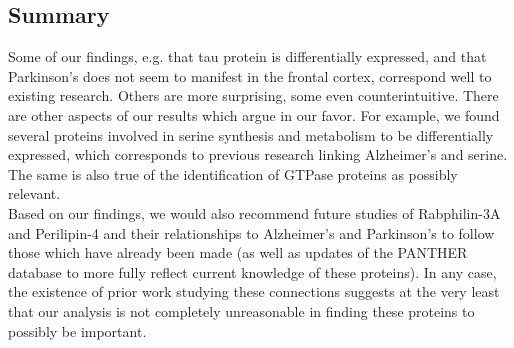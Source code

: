 \subsection{Summary}
\label{sec:summary}

Some of our findings, e.g. that tau protein is differentially expressed, and that Parkinson's does not seem to manifest in the frontal cortex, correspond well to existing research. Others are more surprising, some even counterintuitive. There are other aspects of our results which argue in our favor. For example, we found several proteins involved in serine synthesis and metabolism to be differentially expressed, which corresponds to previous research linking Alzheimer's and serine\cite{HASHIMOTO2004385, KATSOURI2011S702, Madeira2015, clinicaltrials.gov}. The same is also true of the identification of GTPase proteins as possibly relevant\cite{Nishimoto1993, Bolognin2014, Aguilar2017}.\\

Based on our findings, we would also recommend future studies of Rabphilin-3A and Perilipin-4 and their relationships to Alzheimer's and Parkinson's to follow those which have already been made \cite{TAN201429, Stanic2015, STANIC201754} \cite{10.3389/fnins.2018.00397, Shimabukuro2016, Heck2014} (as well as updates of the PANTHER database to more fully reflect current knowledge of these proteins). In any case, the existence of prior work studying these connections suggests at the very least that our analysis is not completely unreasonable in finding these proteins to possibly be important.

\pagebreak






